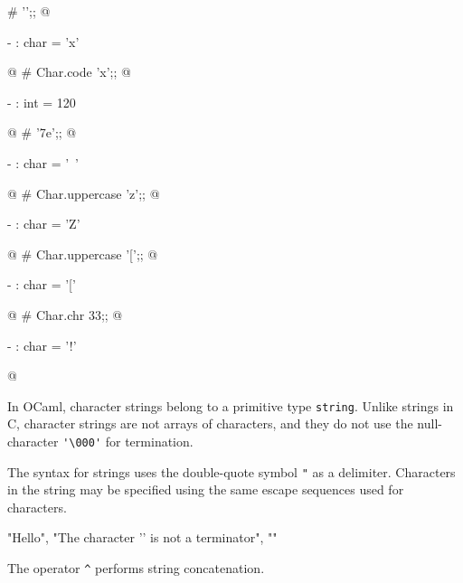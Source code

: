 \begin{ocaml}
# '';;
@
\begin{topoutput}
- : char = 'x'
\end{topoutput}
@
# Char.code 'x';;
@
\begin{topoutput}
- : int = 120
\end{topoutput}
@
# '\x7e';;
@
\begin{topoutput}
- : char = '~'
\end{topoutput}
@
# Char.uppercase 'z';;
@
\begin{topoutput}
- : char = 'Z'
\end{topoutput}
@
# Char.uppercase '[';;
@
\begin{topoutput}
- : char = '['
\end{topoutput}
@
# Char.chr 33;;
@
\begin{topoutput}
- : char = '!'
\end{topoutput}
@
\end{ocaml}

\label{literal:string}

In OCaml, character strings belong to a primitive type \hbox{\lstinline/string/}.
Unlike strings in C, character strings are not arrays of characters,
and they do not use the null-character \hbox{\lstinline/'\000'/} for termination.

The syntax for strings uses the double-quote symbol \hbox{\lstinline/"/} as a
delimiter.  Characters in the string may be specified using the same escape
sequences used for characters.

\begin{center}
\begin{ocaml}
"Hello", "The character '' is not a terminator", ""
\end{ocaml}
\end{center}
%
The operator \hbox{\lstinline/^/}
performs string concatenation.

